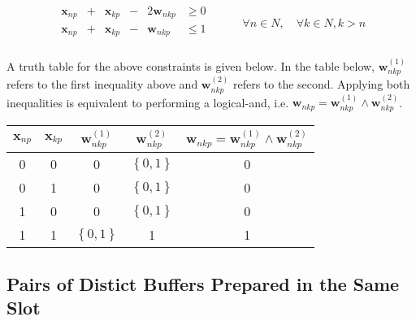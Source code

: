 \begin{equation}
    \begin{split}
        \begin{alignedat}{3}
            \boldsymbol{x}_{np} & {}+{} & \boldsymbol{x}_{kp} & {}-{} & 2 
            \boldsymbol{w}_{nkp} & \ge 0\\
            \boldsymbol{x}_{np} & {}+{} & \boldsymbol{x}_{kp} & {}-{} &
            \boldsymbol{w}_{nkp} & \le 1\\
        \end{alignedat}
    \end{split}
    \quad\quad
    \begin{split}
        \forall n \in N, \quad \forall k \in N, k > n
    \end{split}
\end{equation}

A truth table for the above constraints is given below.
In the table below, $\boldsymbol{w}_{nkp}^{\left( 1 \right)}$ refers to the 
first inequality above and $\boldsymbol{w}_{nkp}^{\left( 2 \right)}$ refers to
the second.  Applying both inequalities is equivalent to performing a
logical-and, i.e. 
$\boldsymbol{w}_{nkp} = \boldsymbol{w}_{nkp}^{\left( 1 \right)} \land
\boldsymbol{w}_{nkp}^{\left( 2 \right)}$.

\begin{center}
    \begin{tabular}{c c | c c | c}
        $\boldsymbol{x}_{np}$ & $\boldsymbol{x}_{kp}$ & 
        $\boldsymbol{w}_{nkp}^{\left( 1 \right)}$ &
        $\boldsymbol{w}_{nkp}^{\left( 2 \right)}$ & 
        $\boldsymbol{w}_{nkp} = \boldsymbol{w}_{nkp}^{\left( 1 \right)}
            \land \boldsymbol{w}_{nkp}^{\left( 2 \right)}
        $\\ \hline
        0 & 0 & 0 & $\left\{ 0,1 \right\}$ & 0\\
        0 & 1 & 0 & $\left\{ 0,1 \right\}$ & 0\\
        1 & 0 & 0 & $\left\{ 0,1 \right\}$ & 0\\
        1 & 1 & $\left\{ 0,1 \right\}$ & 1 & 1\\
    \end{tabular}
\end{center}

\subsection{Pairs of Distict Buffers Prepared in the Same Slot}\label{SS.constr7}

